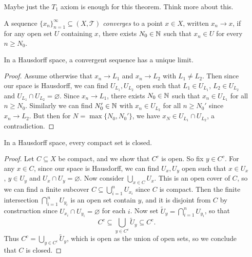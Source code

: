 \begin{remark}
  Maybe just the $T_1$ axiom is enough for this
  theorem. Think more about this.
\end{remark}

\begin{definition}
  A sequence $\{x_n\}_{n = 1}^\infty \subseteq (X, \mathcal{T})$
  \emph{converges} to a point $x \in X$, written
  $x_n \to x$, if for any open set $U$ containing $x$,
  there exists $N_0 \in \mathbb{N}$ such that
  $x_n \in U$ for every $n \ge N_0$.
\end{definition}

\begin{theorem}
  In a Hausdorff space, a convergent sequence has a
  unique limit.
\end{theorem}

\begin{proof}
  Assume otherwise that $x_n \to L_1$ and
  $x_n \to L_2$ with $L_1 \ne L_2$. Then since our
  space is Hausdorff, we can find
  $U_{L_1}, U_{L_2}$ open such that
  $L_1 \in U_{L_1}$, $L_2 \in U_{L_2}$ and
  $U_{L_1} \cap U_{L_2} = \varnothing$. Since
  $x_n \to L_1$, there exists $N_0 \in \mathbb{N}$ such
  that $x_n \in U_{L_1}$ for all $n \ge N_0$.
  Similarly we can find $N_0' \in \mathbb{N}$ with
  $x_n \in U_{L_2}$ for all $n \ge N_0'$ since
  $x_n \to L_2$. But then for $N = \max\{N_0, N_0'\}$,
  we have $x_N \in U_{L_1} \cap U_{L_2}$,
  a contradiction.
\end{proof}

\begin{theorem}
  In a Hausdorff space, every compact set is closed.
\end{theorem}

\begin{proof}
  Let $C \subseteq X$ be compact, and we show
  that $C^c$ is open. So fix $y \in C^c$.
  For any $x \in C$, since our space is Hausdorff,
  we can find $U_x, U_y$ open such that
  $x \in U_x$, $y \in U_y$ and $U_x \cap U_y = \varnothing$.
  Now consider $\bigcup_{x \in C} U_x$. This is
  an open cover of $C$, so we can find a finite
  subcover $C \subseteq \bigcup_{i = 1}^n U_{x_i}$
  since $C$ is compact. Then the finite intersection
  $\bigcap_{i = 1}^n U_{y_i}$ is an open set contain
  $y$, and it is disjoint from $C$ by construction
  since $U_{x_i} \cap U_{y_i} = \varnothing$ for each $i$.
  Now set $\widetilde{U}_y = \bigcap_{i = 1}^n U_{y_i}$, so that
  \[
    C^c \subseteq \bigcup_{y \in C^c} \widetilde{U}_y
    \subseteq C^c.
  \]
  Thus $C^c = \bigcup_{y \in C^c} \widetilde{U}_y$,
  which is open as the union of open sets, so
  we conclude that $C$ is closed.
\end{proof}
